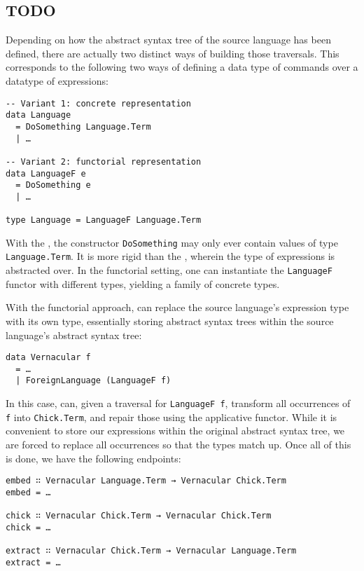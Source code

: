 \subsection{TODO}

Depending on how the abstract syntax tree of the source language has been
defined, there are actually two distinct ways of building those traversals.
This corresponds to the following two ways of defining a data type of commands
over a datatype of expressions:

\begin{verbatim}
-- Variant 1: concrete representation
data Language
  = DoSomething Language.Term
  | …

-- Variant 2: functorial representation
data LanguageF e
  = DoSomething e
  | …

type Language = LanguageF Language.Term
\end{verbatim}

With the , the constructor
\texttt{DoSomething} may only ever contain values of type
\texttt{Language.Term}.  It is more rigid than the
, wherein the type of expressions is
abstracted over.  In the functorial setting, one can instantiate the
\texttt{LanguageF} functor with different types, yielding a family
of concrete types.

With the functorial approach, \Coop{} can replace the source language's
expression type with its own type, essentially storing \Chick{} abstract syntax
trees within the source language's abstract syntax tree:

\begin{verbatim}
data Vernacular f
  = …
  | ForeignLanguage (LanguageF f)
\end{verbatim}

In this case, \Chick{} can, given a traversal for \texttt{LanguageF
f}, transform all occurrences of \texttt{f} into
\texttt{Chick.Term}, and repair those using the applicative
functor.  While it is convenient to store our expressions within the original
abstract syntax tree, we are forced to replace all occurrences so that the types
match up.  Once all of this is done, we have the following endpoints:

\begin{verbatim}
embed ∷ Vernacular Language.Term → Vernacular Chick.Term
embed = …

chick ∷ Vernacular Chick.Term → Vernacular Chick.Term
chick = …

extract ∷ Vernacular Chick.Term → Vernacular Language.Term
extract = …
\end{verbatim}

